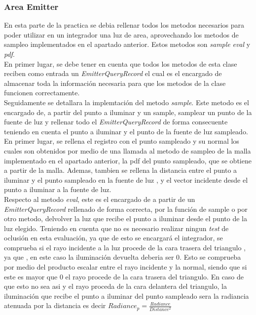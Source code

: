 \documentclass[10pt,oneside,a4paper]{article}
\begin{document}
\subsubsection{Area Emitter}
En esta parte de la practica se debia rellenar todos los metodos necesarios para poder utilizar en un integrador una luz de area, aprovechando los metodos de sampleo implementados en el apartado anterior. Estos metodos son \textit{sample} \textit{eval} y \textit{pdf}.\\

En primer lugar, se debe tener en cuenta que todos los metodos de esta clase reciben como entrada un \textit{EmitterQueryRecord} el cual es el encargado de almacenar toda la información necesaria para que los metodos de la clase funcionen correctamente.\\

Seguidamente se detallara la implemtación del metodo \textit{sample}. Este metodo es el encargado de, a partir del punto a iluminar y un sample, samplear un punto de la fuente de luz y rellenar todo el \textit{EmitterQueryRecord} de forma consecuente teniendo en cuenta el punto a iluminar y el punto de la fuente de luz sampleado. En primer lugar, se rellena el registro con el punto sampleado y su normal los cuales son obtenidos por medio de una llamada al metodo de sampleo de la malla implementado en el apartado anterior, la pdf del punto sampleado, que se obtiene a partir de la malla. Ademas, tambien se rellena la distancia entre el punto a iluminar y el punto sampleado en la fuente de luz , y el vector incidente desde el punto a iluminar a la fuente de luz.\\

Respecto al metodo \textit{eval}, este es el encargado de a partir de un \textit{EmitterQueryRecord} rellenado de forma correcta, por la función de sample o por otro metodo, delvolver la luz que recibe el punto a iluminar desde el punto de la luz elegido. Teniendo en cuenta que no es necesario realizar ningun \textit{test} de oclusión en esta evaluación, ya que de esto se encargará el integrador, se comprueba si el rayo incidente a la luz procede de la cara trasera del triangulo , ya que , en este caso la iluminación devuelta deberia ser 0. Esto se comprueba por medio del producto escalar entre el rayo incidente y la normal, siendo que si este es mayor que 0 el rayo procede de la cara trasera del triangulo. En caso de que esto no sea asi y el rayo proceda de la cara delantera del triangulo, la iluminación que recibe el punto a iluminar del punto sampleado sera la radiancia atenuada por la distancia es decir $Radiance_p = \frac{Radiance}{Distance^2}$\\
\end{document}
